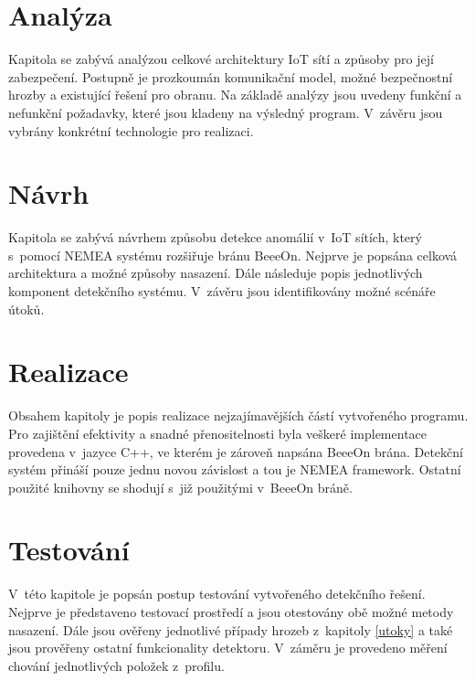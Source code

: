 \documentclass[thesis=M,czech]{FITthesis}[2012/06/26]
\begin{document}
\chapter{Analýza}
Kapitola se zabývá analýzou celkové architektury IoT sítí a způsoby pro její
zabezpečení. Postupně je prozkoumán komunikační model, možné bezpečnostní hrozby 
a existující řešení pro obranu. Na základě analýzy jsou uvedeny funkční a nefunkční
požadavky, které jsou kladeny na výsledný program. V~závěru jsou vybrány konkrétní
technologie pro realizaci.

 


\chapter{Návrh}
Kapitola se zabývá návrhem způsobu detekce anomálií v~IoT sítích, který s~pomocí NEMEA
systému rozšiřuje bránu BeeeOn. Nejprve je popsána celková architektura a
možné způsoby nasazení. Dále následuje popis jednotlivých komponent detekčního systému.
V~závěru jsou identifikovány možné scénáře útoků.

 

\chapter{Realizace}
Obsahem kapitoly je popis realizace nejzajímavějších částí vytvořeného programu. Pro zajištění
efektivity a snadné přenositelnosti byla veškeré implementace provedena v~jazyce C++, ve kterém
je zároveň napsána BeeeOn brána. Detekční systém přináší pouze jednu novou závislost a tou je NEMEA framework.
Ostatní použité knihovny se shodují s~již použitými v~BeeeOn bráně.

 

\chapter{Testování}
V~této kapitole je popsán postup testování vytvořeného detekčního řešení. Nejprve je představeno
testovací prostředí a jsou otestovány obě možné metody nasazení. Dále jsou ověřeny jednotlivé 
případy hrozeb z~kapitoly \ref{utoky} a také jsou prověřeny ostatní funkcionality
detektoru. V~záměru je provedeno měření chování jednotlivých položek z~profilu.

 
\end{document}
